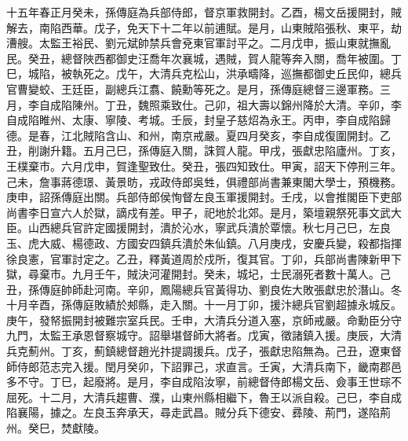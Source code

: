 \begin{pinyinscope}
十五年春正月癸未，孫傳庭為兵部侍郎，督京軍救開封。乙酉，楊文岳援開封，賊解去，南陷西華。戊子，免天下十二年以前逋賦。是月，山東賊陷張秋、東平，劫漕艘。太監王裕民、劉元斌帥禁兵會兗東官軍討平之。二月戊申，振山東就撫亂民。癸丑，總督陜西都御史汪喬年次襄城，遇賊，賀人龍等奔入關，喬年被圍。丁巳，城陷，被執死之。戊午，大清兵克松山，洪承疇降，巡撫都御史丘民仰，總兵官曹變蛟、王廷臣，副總兵江翥、饒勳等死之。是月，孫傳庭總督三邊軍務。三月，李自成陷陳州。丁丑，魏照乘致仕。己卯，祖大壽以錦州降於大清。辛卯，李自成陷睢州、太康、寧陵、考城。壬辰，封皇子慈炤為永王。丙申，李自成陷歸德。是春，江北賊陷含山、和州，南京戒嚴。夏四月癸亥，李自成復圍開封。乙丑，削謝升籍。五月己巳，孫傳庭入關，誅賀人龍。甲戌，張獻忠陷廬州。丁亥，王樸棄市。六月戊申，賀逢聖致仕。癸丑，張四知致仕。甲寅，詔天下停刑三年。己未，詹事蔣德璟、黃景昉，戎政侍郎吳甡，俱禮部尚書兼東閣大學士，預機務。庚申，詔孫傳庭出關。兵部侍郎侯恂督左良玉軍援開封。壬戌，以會推閣臣下吏部尚書李日宣六人於獄，謫戍有差。甲子，祀地於北郊。是月，築壇親祭死事文武大臣。山西總兵官許定國援開封，潰於沁水，寧武兵潰於覃懷。秋七月己巳，左良玉、虎大威、楊德政、方國安四鎮兵潰於朱仙鎮。八月庚戌，安慶兵變，殺都指揮徐良憲，官軍討定之。乙丑，釋黃道周於戍所，復其官。丁卯，兵部尚書陳新甲下獄，尋棄市。九月壬午，賊決河灌開封。癸未，城圮，士民溺死者數十萬人。己丑，孫傳庭帥師赴河南。辛卯，鳳陽總兵官黃得功、劉良佐大敗張獻忠於潛山。冬十月辛酉，孫傳庭敗績於郟縣，走入關。十一月丁卯，援汴總兵官劉超據永城反。庚午，發帑振開封被難宗室兵民。壬申，大清兵分道入塞，京師戒嚴。命勳臣分守九門，太監王承恩督察城守。詔舉堪督師大將者。戊寅，徵諸鎮入援。庚辰，大清兵克薊州。丁亥，薊鎮總督趙光抃提調援兵。戊子，張獻忠陷無為。己丑，遼東督師侍郎范志完入援。閏月癸卯，下詔罪己，求直言。壬寅，大清兵南下，畿南郡邑多不守。丁巳，起廢將。是月，李自成陷汝寧，前總督侍郎楊文岳、僉事王世琮不屈死。十二月，大清兵趨曹、濮，山東州縣相繼下，魯王以派自殺。己巳，李自成陷襄陽，據之。左良玉奔承天，尋走武昌。賊分兵下德安、彞陵、荊門，遂陷荊州。癸巳，焚獻陵。


\end{pinyinscope}
